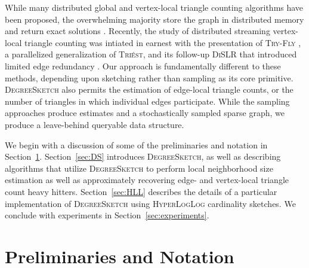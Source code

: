 \documentclass{vldb}
\newcommand{\algoname}[1]{\textnormal{\textsc{#1}}}
\begin{document}
While many distributed global and vertex-local triangle counting algorithms have been proposed, the overwhelming majority store the graph in distributed memory and return exact solutions \cite{suri2011counting, arifuzzaman2013patric, pearce2017triangle}.
Recently, the study of distributed streaming vertex-local triangle counting was intiated in earnest with the presentation of \algoname{Try-Fly} \cite{shin2018tri}, a parallelized generalization of \algoname{Tri\'est}, and its follow-up \algoname{DiSLR} that introduced limited edge redundancy \cite{shin2018dislr}.
Our approach is fundamentally different to these methods, depending upon sketching rather than sampling as its core primitive. 
\algoname{DegreeSketch} also permits the estimation of edge-local triangle counts, or the number of triangles in which individual edges participate.
While the sampling approaches produce estimates and a stochastically sampled sparse graph, we produce a leave-behind queryable data structure.



We begin with a discussion of some of the preliminaries and notation in Section~\ref{sec:notation}.
Section~\ref{sec:DS} introduces \algoname{DegreeSketch}, as well as describing algorithms that utilize \algoname{DegreeSketch} to perform local neighborhood size estimation as well as approximately recovering edge- and vertex-local triangle count heavy hitters.  
Section~\ref{sec:HLL} describes the details of a particular implementation of \algoname{DegreeSketch} using \algoname{HyperLogLog} cardinality sketches.
We conclude with experiments in Section~\ref{sec:experiments}.

\section{Preliminaries and Notation}
 \label{sec:notation}
\end{document}
